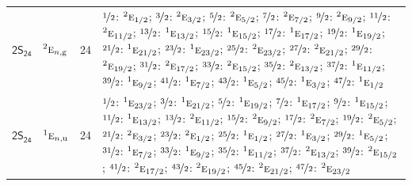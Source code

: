 \documentclass[10pt,a4paper]{article}
\numberwithin{equation}{section}
\newcommand{\grp}[1]{\mathsf{#1}}
\newcommand{\irr}[1]{\text{\normalfont\scshape #1}}
\newcommand{\conjpair}[1]{{}^{#1}}
\newcommand{\ptag}[1]{\mathrm{#1}}
\newlength{\fillwidth}\newlength{\cellwidth}\newlength{\colwidth}
\begin{document}
{\begin{longtable}{@{}llr>{\RaggedRight\arraybackslash}p{\fillwidth}@{}}
\href{2S24.pdf}{$\grp{2S_{24}}$} & $\conjpair{2}\irr{e}_{n,\ptag{g}}$ & 24 & $\nicefrac{1}{2}$: $\conjpair{2}\irr{e}_{1/2}$; $\nicefrac{3}{2}$: $\conjpair{2}\irr{e}_{3/2}$; $\nicefrac{5}{2}$: $\conjpair{2}\irr{e}_{5/2}$; $\nicefrac{7}{2}$: $\conjpair{2}\irr{e}_{7/2}$; $\nicefrac{9}{2}$: $\conjpair{2}\irr{e}_{9/2}$; $\nicefrac{11}{2}$: $\conjpair{2}\irr{e}_{11/2}$; $\nicefrac{13}{2}$: $\conjpair{1}\irr{e}_{13/2}$; $\nicefrac{15}{2}$: $\conjpair{1}\irr{e}_{15/2}$; $\nicefrac{17}{2}$: $\conjpair{1}\irr{e}_{17/2}$; $\nicefrac{19}{2}$: $\conjpair{1}\irr{e}_{19/2}$; $\nicefrac{21}{2}$: $\conjpair{1}\irr{e}_{21/2}$; $\nicefrac{23}{2}$: $\conjpair{1}\irr{e}_{23/2}$; $\nicefrac{25}{2}$: $\conjpair{2}\irr{e}_{23/2}$; $\nicefrac{27}{2}$: $\conjpair{2}\irr{e}_{21/2}$; $\nicefrac{29}{2}$: $\conjpair{2}\irr{e}_{19/2}$; $\nicefrac{31}{2}$: $\conjpair{2}\irr{e}_{17/2}$; $\nicefrac{33}{2}$: $\conjpair{2}\irr{e}_{15/2}$; $\nicefrac{35}{2}$: $\conjpair{2}\irr{e}_{13/2}$; $\nicefrac{37}{2}$: $\conjpair{1}\irr{e}_{11/2}$; $\nicefrac{39}{2}$: $\conjpair{1}\irr{e}_{9/2}$; $\nicefrac{41}{2}$: $\conjpair{1}\irr{e}_{7/2}$; $\nicefrac{43}{2}$: $\conjpair{1}\irr{e}_{5/2}$; $\nicefrac{45}{2}$: $\conjpair{1}\irr{e}_{3/2}$; $\nicefrac{47}{2}$: $\conjpair{1}\irr{e}_{1/2}$\\
\href{2S24.pdf}{$\grp{2S_{24}}$} & $\conjpair{1}\irr{e}_{n,\ptag{u}}$ & 24 & $\nicefrac{1}{2}$: $\conjpair{1}\irr{e}_{23/2}$; $\nicefrac{3}{2}$: $\conjpair{1}\irr{e}_{21/2}$; $\nicefrac{5}{2}$: $\conjpair{1}\irr{e}_{19/2}$; $\nicefrac{7}{2}$: $\conjpair{1}\irr{e}_{17/2}$; $\nicefrac{9}{2}$: $\conjpair{1}\irr{e}_{15/2}$; $\nicefrac{11}{2}$: $\conjpair{1}\irr{e}_{13/2}$; $\nicefrac{13}{2}$: $\conjpair{2}\irr{e}_{11/2}$; $\nicefrac{15}{2}$: $\conjpair{2}\irr{e}_{9/2}$; $\nicefrac{17}{2}$: $\conjpair{2}\irr{e}_{7/2}$; $\nicefrac{19}{2}$: $\conjpair{2}\irr{e}_{5/2}$; $\nicefrac{21}{2}$: $\conjpair{2}\irr{e}_{3/2}$; $\nicefrac{23}{2}$: $\conjpair{2}\irr{e}_{1/2}$; $\nicefrac{25}{2}$: $\conjpair{1}\irr{e}_{1/2}$; $\nicefrac{27}{2}$: $\conjpair{1}\irr{e}_{3/2}$; $\nicefrac{29}{2}$: $\conjpair{1}\irr{e}_{5/2}$; $\nicefrac{31}{2}$: $\conjpair{1}\irr{e}_{7/2}$; $\nicefrac{33}{2}$: $\conjpair{1}\irr{e}_{9/2}$; $\nicefrac{35}{2}$: $\conjpair{1}\irr{e}_{11/2}$; $\nicefrac{37}{2}$: $\conjpair{2}\irr{e}_{13/2}$; $\nicefrac{39}{2}$: $\conjpair{2}\irr{e}_{15/2}$; $\nicefrac{41}{2}$: $\conjpair{2}\irr{e}_{17/2}$; $\nicefrac{43}{2}$: $\conjpair{2}\irr{e}_{19/2}$; $\nicefrac{45}{2}$: $\conjpair{2}\irr{e}_{21/2}$; $\nicefrac{47}{2}$: $\conjpair{2}\irr{e}_{23/2}$\\

\end{longtable}}
\end{document}
